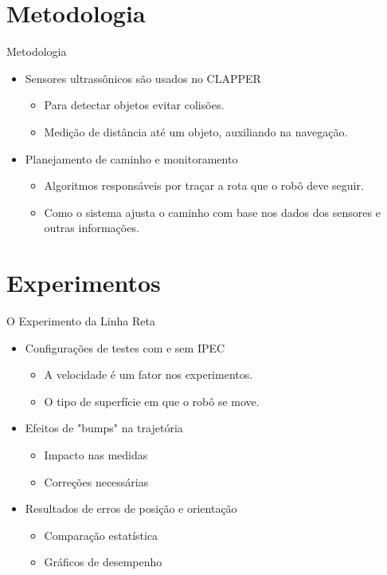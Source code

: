 \documentclass[xcolor=dvipsnames, aspectratio=169]{beamer}
\begin{document}
\section{Metodologia}
\begin{frame}{Metodologia}
  \begin{itemize}
    \item Sensores ultrassônicos são usados no CLAPPER
      \begin{itemize}
        \item Para detectar objetos evitar colisões.
        \item Medição de distância até um objeto, auxiliando na navegação.
      \end{itemize}
    \item Planejamento de caminho e monitoramento
      \begin{itemize}
        \item Algoritmos responsáveis por traçar a rota que o robô deve seguir.
        \item Como o sistema ajusta o caminho com base nos dados dos sensores e outras informações.
      \end{itemize}
  \end{itemize}
\end{frame}

\section{Experimentos}
\begin{frame}{O Experimento da Linha Reta}
  \begin{itemize}
    \item Configurações de testes com e sem IPEC
      \begin{itemize}
        \item A velocidade é um fator nos experimentos.
        \item O tipo de superfície em que o robô se move.
      \end{itemize}
    \item Efeitos de "bumps" na trajetória
      \begin{itemize}
        \item Impacto nas medidas
        \item Correções necessárias
      \end{itemize}
    \item Resultados de erros de posição e orientação
      \begin{itemize}
        \item Comparação estatística
        \item Gráficos de desempenho
      \end{itemize}
  \end{itemize}
\end{frame}
\end{document}
